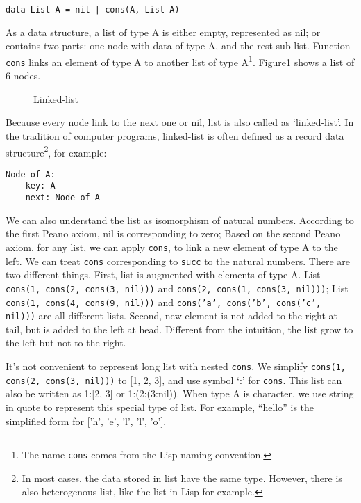 \documentclass[UTF8]{article}
\begin{document}
\lstset{frame=none}
\begin{lstlisting}
data List A = nil | cons(A, List A)
\end{lstlisting}

As a data structure, a list of type A is either empty, represented as nil; or contains two parts: one node with data of type A, and the rest sub-list. Function \texttt{cons} links an element of type A to another list of type A\footnote{The name \texttt{cons} comes from the Lisp naming convention.}. Figure\ref{fig:linked-list} shows a list of 6 nodes.

\begin{figure}[htbp]
\centering
{}
\caption{Linked-list}
\label{fig:linked-list}
\end{figure}

Because every node link to the next one or nil, list is also called as `linked-list'. In the tradition of computer programs, linked-list is often defined as a record data structure\footnote{In most cases, the data stored in list have the same type. However, there is also heterogenous list, like the list in Lisp for example.}, for example:

\begin{verbatim}
Node of A:
    key: A
    next: Node of A
\end{verbatim}

We can also understand the list as isomorphism of natural numbers. According to the first Peano axiom, nil is corresponding to zero; Based on the second Peano axiom, for any list, we can apply \texttt{cons}, to link a new element of type A to the left. We can treat \texttt{cons} corresponding to \texttt{succ} to the natural numbers. There are two different things. First, list is augmented with elements of type A. List \texttt{cons(1, cons(2, cons(3, nil)))} and \texttt{cons(2, cons(1, cons(3, nil)))}; List \texttt{cons(1, cons(4, cons(9, nil)))} and \texttt{cons('a', cons('b', cons('c', nil)))} are all different lists. Second, new element is not added to the right at tail, but is added to the left at head. Different from the intuition, the list grow to the left but not to the right.

It's not convenient to represent long list with nested \texttt{cons}. We simplify \texttt{cons(1, cons(2, cons(3, nil)))} to [1, 2, 3], and use symbol `:' for \texttt{cons}. This list can also be written as 1:[2, 3] or 1:(2:(3:nil)). When type A is character, we use string in quote to represent this special type of list. For example, ``hello'' is the simplified form for ['h', 'e', 'l', 'l', 'o'].
\end{document}
